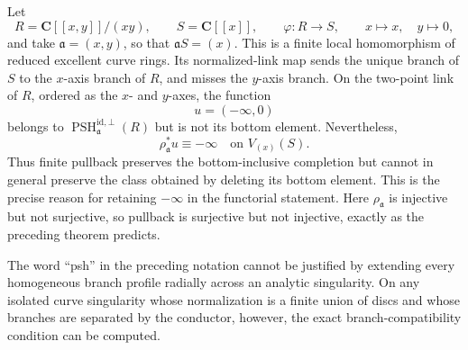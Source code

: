 \begin{example}
\label{ex:p122-curve-psh-pullback-bottom}
Let
\[
 R=\mathbf C[[x,y]]/(xy),\qquad S=\mathbf C[[x]],
 \qquad
 \varphi:R\longrightarrow S,\qquad x\longmapsto x,\quad y\longmapsto0,
\]
and take \(\mathfrak a=(x,y)\), so that
\(\mathfrak aS=(x)\).  This is a finite local homomorphism of reduced
excellent curve rings.  Its normalized-link map sends the unique branch of
\(S\) to the \(x\)-axis branch of \(R\), and misses the \(y\)-axis branch.
On the two-point link of \(R\), ordered as the \(x\)- and \(y\)-axes, the
function
\[
                              u=(-\infty,0)
\]
belongs to \(\operatorname{PSH}^{\mathrm{id},\bot}_{\mathfrak a}(R)\)
but is not its bottom element.  Nevertheless,
\[
                 \rho_{\mathfrak a}^*u\equiv-\infty
                 \quad\text{on }V_{(x)}(S).
\]
Thus finite pullback preserves the bottom-inclusive completion but cannot in
general preserve the class obtained by deleting its bottom element.  This is
the precise reason for retaining \(-\infty\) in the functorial statement.
Here \(\rho_{\mathfrak a}\) is injective but not surjective, so pullback is
surjective but not injective, exactly as the preceding theorem predicts.
\end{example}

The word ``psh'' in the preceding notation cannot be justified by extending
every homogeneous branch profile radially across an analytic singularity.
On any isolated curve singularity whose normalization is a finite union of
discs and whose branches are separated by the conductor, however, the exact
branch-compatibility condition can be computed.

